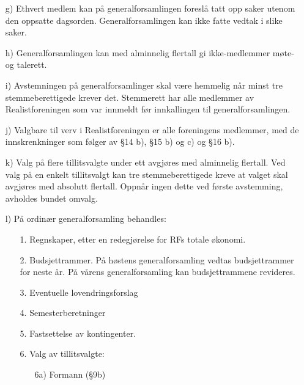 \begin{itemize}
\item[g)] Ethvert medlem kan på generalforsamlingen foreslå tatt opp saker
utenom den oppsatte dagsorden. Generalforsamlingen kan ikke fatte
vedtak i slike saker.

\item[h)] Generalforsamlingen kan med alminnelig flertall gi ikke-medlemmer
møte- og talerett.

\item[i)] Avstemningen på generalforsamlinger skal være hemmelig når minst
tre stemmeberettigede krever det.  Stemmerett har alle medlemmer av
Realistforeningen som var innmeldt før innkallingen til
generalforsamlingen.

\item[j)] Valgbare til verv i Realistforeningen er alle foreningens
medlemmer, med de innskrenkninger som følger av §14 b), §15 b) og c) og 
§16 b).

\item[k)] Valg på flere tillitsvalgte under ett avgjøres med alminnelig
flertall.  Ved valg på en enkelt tillitsvalgt kan tre
stemmeberettigede kreve at valget skal avgjøres med absolutt
flertall.  Oppnår ingen dette ved første avstemming, avholdes bundet
omvalg.

\item[l)] På ordinær generalforsamling behandles:

        \begin{itemize}
        \item[1.] Regnskaper, etter en redegjørelse for RFs totale økonomi. 
        
        \item[2.] Budsjettrammer.  På høstens generalforsamling vedtas 
                  budsjettrammer for neste år.  På vårens generalforsamling 
                  kan budsjettrammene revideres.

        \item[3.] Eventuelle lovendringsforslag 

        \item[4.] Semesterberetninger 

        \item[5.] Fastsettelse av kontingenter. 

        \item[6.] Valg av tillitsvalgte: 

                \begin{itemize}
                \item[6a)] Formann (§9b) 
    

\end{itemize}
\end{itemize}
\end{itemize}
